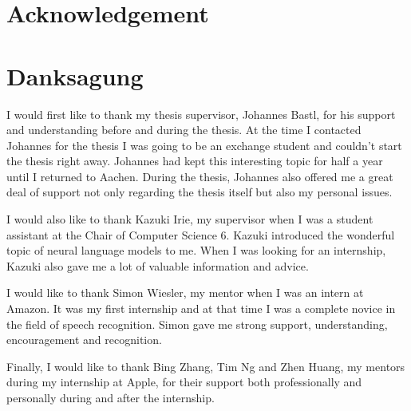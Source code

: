 { \chapter{Acknowledgement} }
{ \chapter{Danksagung}		}
I would first like to thank my thesis supervisor, Johannes Bastl, for his support and understanding before and during the thesis. At the time I contacted Johannes for the thesis I was going to be an exchange student and couldn't start the thesis right away. Johannes had kept this interesting topic for half a year until I returned to Aachen. During the thesis, Johannes also offered me a great deal of support not only regarding the thesis itself but also my personal issues.

I would also like to thank Kazuki Irie, my supervisor when I was a student assistant at the Chair of Computer Science 6. Kazuki introduced the wonderful topic of neural language models to me. When I was looking for an internship, Kazuki also gave me a lot of valuable information and advice. 

I would like to thank Simon Wiesler, my mentor when I was an intern at Amazon. It was my first internship and at that time I was a complete novice in the field of speech recognition. Simon gave me strong support, understanding, encouragement and recognition.

Finally, I would like to thank Bing Zhang, Tim Ng and Zhen Huang, my mentors during my internship at Apple, for their support both professionally and personally during and after the internship. 